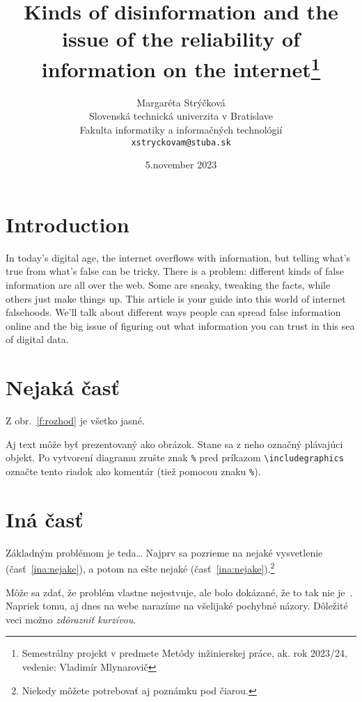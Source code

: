 \documentclass[10pt,twoside,slovak,a4paper]{article}
\title{Kinds of disinformation and the issue of the reliability of information on the internet\thanks{Semestrálny projekt v predmete Metódy inžinierskej práce, ak. rok 2023/24, vedenie: Vladimír Mlynarovič}} %
\author{Margaréta Strýčková\\[2pt]
	{\small Slovenská technická univerzita v Bratislave}\\
	{\small Fakulta informatiky a informačných technológií}\\
	{\small \texttt{xstryckovam@stuba.sk}}
	}
\date{\small 5.november 2023} %
\begin{document}
\maketitle





\section{Introduction}


In today's digital age, the internet overflows with information, but telling what's true from what's false can be tricky. There is a problem: different kinds of false information are all over the web. Some are sneaky, tweaking the facts, while others just make things up. This article is your guide into this world of internet falsehoods. We'll talk about different ways people can spread false information online and the big issue of figuring out what information you can trust in this sea of digital data.





\section{Nejaká časť} \label{nejaka}

Z obr.~\ref{f:rozhod} je všetko jasné. 

\begin{figure*}[tbh]
\centering
Aj text môže byť prezentovaný ako obrázok. Stane sa z neho označný plávajúci objekt. Po vytvorení diagramu zrušte znak \texttt{\%} pred príkazom \verb|\includegraphics| označte tento riadok ako komentár (tiež pomocou znaku \texttt{\%}).
\caption{Rozhodujúci argument.}
\label{f:rozhod}
\end{figure*}



\section{Iná časť} \label{ina}

Základným problémom je teda\ldots{} Najprv sa pozrieme na nejaké vysvetlenie (časť~\ref{ina:nejake}), a potom na ešte nejaké (časť~\ref{ina:nejake}).\footnote{Niekedy môžete potrebovať aj poznámku pod čiarou.}

Môže sa zdať, že problém vlastne nejestvuje\cite{Coplien:MPD}, ale bolo dokázané, že to tak nie je~\cite{Czarnecki:Staged, Czarnecki:Progress}. Napriek tomu, aj dnes na webe narazíme na všelijaké pochybné názory\cite{PLP-Framework}. Dôležité veci možno \emph{zdôrazniť kurzívou}.
\end{document}
